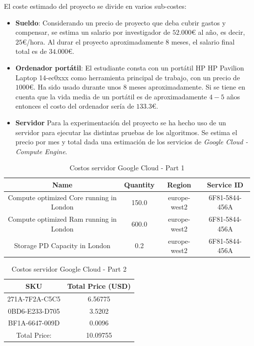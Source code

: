 El coste estimado del proyecto se divide en varios sub-costes:
\begin{itemize}
      \item \textbf{Sueldo}: Considerando un precio de proyecto que deba cubrir gastos y compensar, se estima un salario por investigador de $52.000$€ al año, es decir, $25$€/hora. Al durar el proyecto aproximadamente $8$ meses, el salario final total es de $34.000$€.
      \item \textbf{Ordenador portátil}: El estudiante consta con un portátil HP HP Pavilion Laptop 14-ec0xxx como herramienta principal de trabajo, con un precio de $1000$€. Ha sido usado durante unos $8$ meses aproximadamente. Si se tiene en cuenta que la vida media de un portátil es de aproximadamente $4-5$ años~\cite{woidasky_use_2021} entonces el costo del ordenador sería de $133.3$€.
      \item \textbf{Servidor} Para la experimentación del proyecto se ha hecho uso de un servidor para ejecutar las distintas pruebas de los algoritmos. Se estima el precio por mes y total dada una estimación de los servicios de \textit{Google Cloud - Compute Engine}.
\end{itemize}
\begin{table}[H]
      \centering
      \begin{tabular}{|c|c|c|c|}
            \hline
            \textbf{Name}                            & \textbf{Quantity} & \textbf{Region} & \textbf{Service ID} \\
            \hline
            Compute optimized Core running in London & 150.0             & europe-west2    & 6F81-5844-456A      \\
            Compute optimized Ram running in London  & 600.0             & europe-west2    & 6F81-5844-456A      \\
            Storage PD Capacity in London            & 0.2               & europe-west2    & 6F81-5844-456A      \\
            \hline
      \end{tabular}
      \caption{Costos servidor Google Cloud - Part 1}
      \label{tab:server_costs_part1}
\end{table}
\begin{table}[H]
      \centering
      \begin{tabular}{|c|c|}
            \hline
            \textbf{SKU}   & \textbf{Total Price (USD)} \\
            \hline
            271A-7F2A-C5C5 & 6.56775                    \\
            0BD6-E233-D705 & 3.5202                     \\
            BF1A-6647-009D & 0.0096                     \\
            \hline
            Total Price:   & 10.09755                   \\
            \hline
      \end{tabular}
      \caption{Costos servidor Google Cloud - Part 2}
      \label{tab:server_costs_part2}
\end{table}
